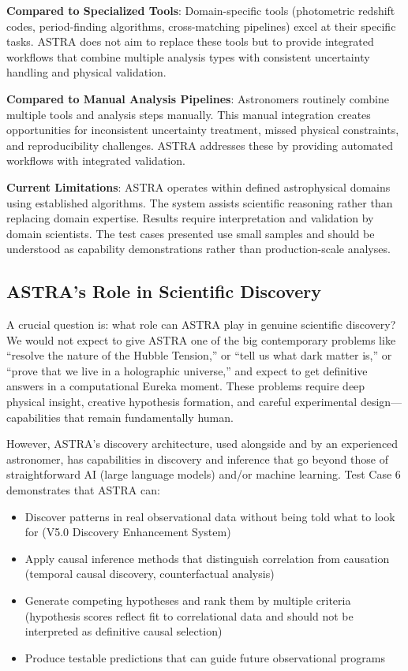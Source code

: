 \documentclass[usenatbib]{rasti}
\begin{document}
\textbf{Compared to Specialized Tools}: Domain-specific tools (photometric redshift codes, period-finding algorithms, cross-matching pipelines) excel at their specific tasks. ASTRA does not aim to replace these tools but to provide integrated workflows that combine multiple analysis types with consistent uncertainty handling and physical validation.

\textbf{Compared to Manual Analysis Pipelines}: Astronomers routinely combine multiple tools and analysis steps manually. This manual integration creates opportunities for inconsistent uncertainty treatment, missed physical constraints, and reproducibility challenges. ASTRA addresses these by providing automated workflows with integrated validation.

\textbf{Current Limitations}: ASTRA operates within defined astrophysical domains using established algorithms. The system assists scientific reasoning rather than replacing domain expertise. Results require interpretation and validation by domain scientists. The test cases presented use small samples and should be understood as capability demonstrations rather than production-scale analyses.

\subsection{ASTRA's Role in Scientific Discovery}

A crucial question is: what role can ASTRA play in genuine scientific discovery? We would not expect to give ASTRA one of the big contemporary problems like ``resolve the nature of the Hubble Tension,'' or ``tell us what dark matter is,'' or ``prove that we live in a holographic universe,'' and expect to get definitive answers in a computational Eureka moment. These problems require deep physical insight, creative hypothesis formation, and careful experimental design---capabilities that remain fundamentally human.

However, ASTRA's discovery architecture, used alongside and by an experienced astronomer, has capabilities in discovery and inference that go beyond those of straightforward AI (large language models) and/or machine learning. Test Case 6 demonstrates that ASTRA can:
\begin{itemize}
\item Discover patterns in real observational data without being told what to look for (V5.0 Discovery Enhancement System)
\item Apply causal inference methods that distinguish correlation from causation (temporal causal discovery, counterfactual analysis)
\item Generate competing hypotheses and rank them by multiple criteria (hypothesis scores reflect fit to correlational data and should not be interpreted as definitive causal selection)
\item Produce testable predictions that can guide future observational programs
\end{itemize}
\end{document}
